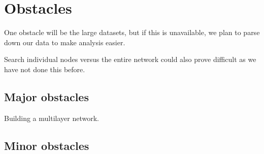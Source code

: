 \documentclass{proc}
\begin{document}
\section{Obstacles}

One obstacle will be the large datasets, but if this is unavailable, we plan to parse down our data to make analysis easier.

Search individual nodes versus the entire network could also prove difficult as we have not done this before.

\subsection{Major obstacles} %

Building a multilayer network.

\subsection{Minor obstacles}
\end{document}
